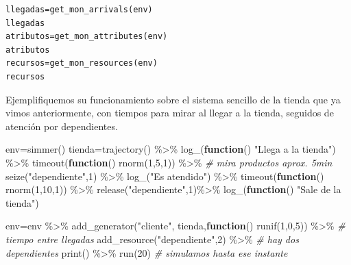 \documentclass[
]{book}
\newenvironment{Shaded}{\begin{snugshade}}{\end{snugshade}}
\newcommand{\CommentTok}[1]{\textcolor[rgb]{0.56,0.35,0.01}{\textit{#1}}}
\newcommand{\ControlFlowTok}[1]{\textcolor[rgb]{0.13,0.29,0.53}{\textbf{#1}}}
\newcommand{\DecValTok}[1]{\textcolor[rgb]{0.00,0.00,0.81}{#1}}
\newcommand{\FunctionTok}[1]{\textcolor[rgb]{0.00,0.00,0.00}{#1}}
\newcommand{\NormalTok}[1]{#1}
\newcommand{\OtherTok}[1]{\textcolor[rgb]{0.56,0.35,0.01}{#1}}
\newcommand{\SpecialCharTok}[1]{\textcolor[rgb]{0.00,0.00,0.00}{#1}}
\newcommand{\StringTok}[1]{\textcolor[rgb]{0.31,0.60,0.02}{#1}}
\theoremstyle{definition}
\theoremstyle{definition}
\theoremstyle{definition}
\theoremstyle{definition}
\theoremstyle{remark}
\begin{document}
\begin{verbatim}
llegadas=get_mon_arrivals(env) 
llegadas
atributos=get_mon_attributes(env)
atributos
recursos=get_mon_resources(env)
recursos
\end{verbatim}

Ejemplifiquemos su funcionamiento sobre el sistema sencillo de la tienda que ya vimos anteriormente, con tiempos para mirar al llegar a la tienda, seguidos de atención por dependientes.

\begin{Shaded}
\begin{Highlighting}[]
\NormalTok{env}\OtherTok{=}\FunctionTok{simmer}\NormalTok{()}
\NormalTok{tienda}\OtherTok{=}\FunctionTok{trajectory}\NormalTok{() }\SpecialCharTok{\%\textgreater{}\%}
  \FunctionTok{log\_}\NormalTok{(}\ControlFlowTok{function}\NormalTok{()  }\StringTok{"Llega a la tienda"}\NormalTok{) }\SpecialCharTok{\%\textgreater{}\%}
  \FunctionTok{timeout}\NormalTok{(}\ControlFlowTok{function}\NormalTok{() }\FunctionTok{rnorm}\NormalTok{(}\DecValTok{1}\NormalTok{,}\DecValTok{5}\NormalTok{,}\DecValTok{1}\NormalTok{)) }\SpecialCharTok{\%\textgreater{}\%} \CommentTok{\# mira productos aprox. 5min}
  \FunctionTok{seize}\NormalTok{(}\StringTok{"dependiente"}\NormalTok{,}\DecValTok{1}\NormalTok{) }\SpecialCharTok{\%\textgreater{}\%}
  \FunctionTok{log\_}\NormalTok{(}\StringTok{"Es atendido"}\NormalTok{) }\SpecialCharTok{\%\textgreater{}\%}
  \FunctionTok{timeout}\NormalTok{(}\ControlFlowTok{function}\NormalTok{() }\FunctionTok{rnorm}\NormalTok{(}\DecValTok{1}\NormalTok{,}\DecValTok{10}\NormalTok{,}\DecValTok{1}\NormalTok{)) }\SpecialCharTok{\%\textgreater{}\%}
  \FunctionTok{release}\NormalTok{(}\StringTok{"dependiente"}\NormalTok{,}\DecValTok{1}\NormalTok{)}\SpecialCharTok{\%\textgreater{}\%}
  \FunctionTok{log\_}\NormalTok{(}\ControlFlowTok{function}\NormalTok{() }\StringTok{"Sale de la tienda"}\NormalTok{)}

\NormalTok{env}\OtherTok{=}\NormalTok{env }\SpecialCharTok{\%\textgreater{}\%}
  \FunctionTok{add\_generator}\NormalTok{(}\StringTok{"cliente"}\NormalTok{, tienda,}\ControlFlowTok{function}\NormalTok{() }\FunctionTok{runif}\NormalTok{(}\DecValTok{1}\NormalTok{,}\DecValTok{0}\NormalTok{,}\DecValTok{5}\NormalTok{)) }\SpecialCharTok{\%\textgreater{}\%} \CommentTok{\# tiempo entre llegadas }
  \FunctionTok{add\_resource}\NormalTok{(}\StringTok{"dependiente"}\NormalTok{,}\DecValTok{2}\NormalTok{) }\SpecialCharTok{\%\textgreater{}\%} \CommentTok{\# hay dos dependientes}
  \FunctionTok{print}\NormalTok{() }\SpecialCharTok{\%\textgreater{}\%}
  \FunctionTok{run}\NormalTok{(}\DecValTok{20}\NormalTok{) }\CommentTok{\# simulamos hasta ese instante}
\end{Highlighting}
\end{Shaded}
\end{document}
